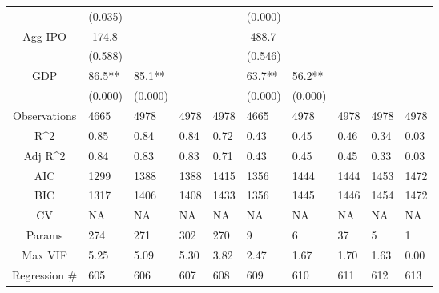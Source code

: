 \documentclass{article}
\begin{document}
\begin{table}[H]
\begin{tabular}{|clllllllll|}
   & (0.035) &  &  &  & (0.000) &  &  &  &  \\ 
  Agg IPO & -174.8 &  &  &  & -488.7 &  &  &  &  \\ 
   & (0.588) &  &  &  & (0.546) &  &  &  &  \\ 
  GDP & 86.5** & 85.1** &  &  & 63.7** & 56.2** &  &  &  \\ 
   & (0.000) & (0.000) &  &  & (0.000) & (0.000) &  &  &  \\ 
  \hline 
 Observations & 4665 & 4978 & 4978 & 4978 & 4665 & 4978 & 4978 & 4978 & 4978 \\ 
  R^2 & 0.85 & 0.84 & 0.84 & 0.72 & 0.43 & 0.45 & 0.46 & 0.34 & 0.03 \\ 
  Adj R^2 & 0.84 & 0.83 & 0.83 & 0.71 & 0.43 & 0.45 & 0.45 & 0.33 & 0.03 \\ 
  AIC & 1299 & 1388 & 1388 & 1415 & 1356 & 1444 & 1444 & 1453 & 1472 \\ 
  BIC & 1317 & 1406 & 1408 & 1433 & 1356 & 1445 & 1446 & 1454 & 1472 \\ 
  CV & NA & NA & NA & NA & NA & NA & NA & NA & NA \\ 
  Params & 274 & 271 & 302 & 270 & 9 & 6 & 37 & 5 & 1 \\ 
  Max VIF & 5.25 & 5.09 & 5.30 & 3.82 & 2.47 & 1.67 & 1.70 & 1.63 & 0.00 \\ 
  Regression \# & 605 & 606 & 607 & 608 & 609 & 610 & 611 & 612 & 613 \\ 
   \hline
\end{tabular}
 
\end{table}
\end{document}
